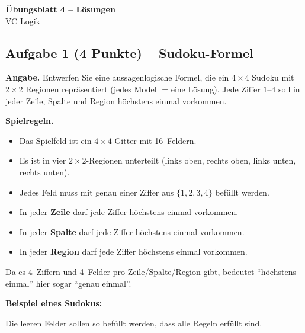 \documentclass[a4paper,12pt]{article}
\begin{document}
\begin{center}
{\LARGE\bfseries \"Ubungsblatt 4 -- L\"osungen}\\[0.5em]
{\large VC Logik}
\end{center}

\bigskip

\subsection*{Aufgabe 1 \textnormal{(4 Punkte)} -- Sudoku-Formel}

\textbf{Angabe.} Entwerfen Sie eine aussagenlogische Formel, die ein
$4 \times 4$ Sudoku mit $2 \times 2$ Regionen repr\"asentiert (jedes
Modell = eine L\"osung). Jede Ziffer $1$--$4$ soll in jeder Zeile,
Spalte und Region h\"ochstens einmal vorkommen.

\medskip
\textbf{Spielregeln.}
\begin{itemize}[nosep]
\item Das Spielfeld ist ein $4 \times 4$-Gitter mit 16~Feldern.
\item Es ist in vier $2 \times 2$-Regionen unterteilt
      (links oben, rechts oben, links unten, rechts unten).
\item Jedes Feld muss mit genau einer Ziffer aus $\{1,2,3,4\}$
      bef\"ullt werden.
\item In jeder \textbf{Zeile} darf jede Ziffer h\"ochstens einmal
      vorkommen.
\item In jeder \textbf{Spalte} darf jede Ziffer h\"ochstens einmal
      vorkommen.
\item In jeder \textbf{Region} darf jede Ziffer h\"ochstens einmal
      vorkommen.
\end{itemize}
Da es 4~Ziffern und 4~Felder pro Zeile/Spalte/Region gibt, bedeutet
``h\"ochstens einmal'' hier sogar ``genau einmal''.

\medskip
\textbf{Beispiel eines Sudokus:}

\begin{center}
\end{center}
Die leeren Felder sollen so bef\"ullt werden, dass alle Regeln
erf\"ullt sind.
\end{document}

